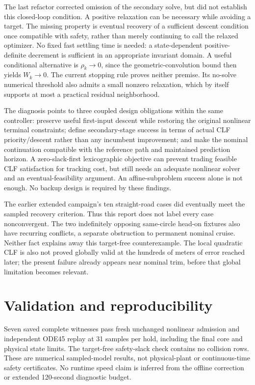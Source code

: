 \documentclass[11pt]{article}
\begin{document}
The last refactor corrected omission of the secondary solve, but did not
establish this closed-loop condition. A positive relaxation can be necessary
while avoiding a target. The missing property is eventual recovery of a
sufficient descent condition once compatible with safety, rather than merely
continuing to call the relaxed optimizer. No fixed fast settling time is
needed: a state-dependent positive-definite decrement is sufficient in an
appropriate invariant domain. A useful conditional alternative is
$\rho_k\to0$, since the geometric-convolution bound then yields $W_k\to0$.
The current stopping rule proves neither premise. Its no-solve numerical
threshold also admits a small nonzero relaxation, which by itself supports
at most a practical residual neighborhood.

The diagnosis points to three coupled design obligations within the same
controller: preserve useful first-input descent while restoring the original
nonlinear terminal constraints; define secondary-stage success in terms of
actual CLF priority/descent rather than any incumbent improvement; and make
the nominal continuation compatible with the reference path and maintained
prediction horizon. A zero-slack-first lexicographic objective can prevent
trading feasible CLF satisfaction for tracking cost, but still needs an
adequate nonlinear solver and an eventual-feasibility argument. An
affine-subproblem success alone is not enough. No backup design is required
by these findings.

The earlier extended campaign's ten straight-road cases did eventually meet
the sampled recovery criterion. Thus this report does not label every case
nonconvergent. The two indefinitely opposing same-circle head-on fixtures
also have recurring conflicts, a separate obstruction to permanent nominal
cruise. Neither fact explains away this target-free counterexample. The local
quadratic CLF is also not proved globally valid at the hundreds of meters of
error reached later; the present failure already appears near nominal trim,
before that global limitation becomes relevant.

\section{Validation and reproducibility}
Seven saved complete witnesses pass fresh unchanged nonlinear admission and
independent ODE45 replay at 31 samples per hold, including the final core and
physical state limits. The target-free safety-slack check contains no collision
rows. These are numerical sampled-model results, not physical-plant or
continuous-time safety certificates. No runtime speed claim is inferred from
the offline correction or extended 120-second diagnostic budget.
\end{document}
